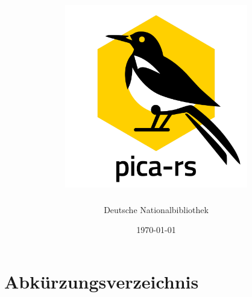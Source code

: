 \documentclass[a4paper,12pt,oneside]{scrreport}
\begin{document}
\title{\includegraphics[width=0.6\textwidth]{logo}}
\author{Deutsche Nationalbibliothek}
\date{\today}

\maketitle
\tableofcontents
\clearpage

\chapter*{Abkürzungsverzeichnis}









\end{document}
